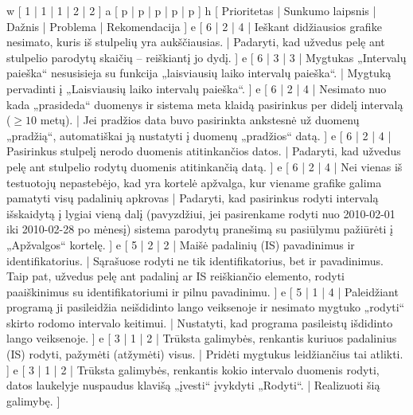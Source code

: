 \xtable
{
  w [ 1 | 1 | 1 | 2 | 2 ]
  a [ p | p | p | p | p ]
  h [ Prioritetas | Sunkumo laipsnis | Dažnis | Problema | Rekomendacija ]
  e [ 6 | 2 | 4 |
    Ieškant didžiausios grafike nesimato, kuris iš stulpelių yra
    aukščiausias. |
    Padaryti, kad užvedus pelę ant stulpelio parodytų skaičių – reiškiantį
    jo dydį.
    ]
  e [ 6 | 3 | 3 |
    Mygtukas „Intervalų paieška“ nesusisieja su funkcija „laisviausių
    laiko intervalų paieška“. |
    Mygtuką pervadinti į „Laisviausių laiko intervalų paieška“.
    ]
  e [ 6 | 2 | 4 |
    Nesimato nuo kada „prasideda“ duomenys ir sistema meta klaidą 
    pasirinkus per didelį intervalą ($\geq 10$ metų). |
    Jei pradžios data buvo pasirinkta ankstesnė už duomenų „pradžią“,
    automatiškai ją nustatyti į duomenų „pradžios“ datą.
    ]
  e [ 6 | 2 | 4 |
    Pasirinkus stulpelį nerodo duomenis atitinkančios datos. |
    Padaryti, kad užvedus pelę ant stulpelio rodytų duomenis atitinkančią
    datą.
    ]
  e [ 6 | 2 | 4 |
    Nei vienas iš testuotojų nepastebėjo, kad yra kortelė apžvalga,
    kur viename grafike galima pamatyti visų padalinių apkrovas |
    Padaryti, kad pasirinkus rodyti intervalą išskaidytą į lygiai vieną
    dalį (pavyzdžiui, jei pasirenkame rodyti nuo 2010-02-01 iki
    2010-02-28 po mėnesį) sistema parodytų pranešimą su pasiūlymu
    pažiūrėti į „Apžvalgos“ kortelę.
    ]
  e [ 5 | 2 | 2 |
    Maišė padalinių (IS) pavadinimus ir identifikatorius. |
    Sąrašuose rodyti ne tik identifikatorius, bet ir pavadinimus. Taip
    pat, užvedus pelę ant padalinį ar IS reiškiančio elemento,
    rodyti paaiškinimus su identifikatoriumi ir pilnu pavadinimu.
    ]
  e [ 5 | 1 | 4 |
    Paleidžiant programą ji pasileidžia neišdidinto lango veiksenoje
    ir nesimato mygtuko „rodyti“ skirto rodomo intervalo keitimui. |
    Nustatyti, kad programa pasileistų išdidinto lango veiksenoje.
    ]
  e [ 3 | 1 | 2 |
    Trūksta galimybės, renkantis kuriuos padalinius (IS) rodyti,
    pažymėti (atžymėti) visus. |
    Pridėti mygtukus leidžiančius tai atlikti.
    ]
  e [ 3 | 1 | 2 |
    Trūksta galimybės, renkantis kokio intervalo duomenis rodyti,
    datos laukelyje nuspaudus klavišą „įvesti“ įvykdyti „Rodyti“. |
    Realizuoti šią galimybę.
    ]
}
